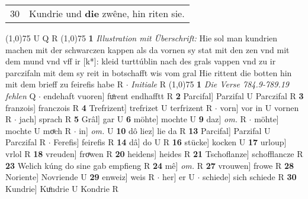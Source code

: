 \documentclass[8pt,a4paper,notitlepage]{article}
\begin{document}
\begin{table}[ht]
\begin{minipage}[t]{0.5\linewidth}
\begin{tabular}{rl}
30 & Kundrie und \textbf{die} zwêne, hin riten sie.\\ 
\end{tabular}
\scriptsize
\line(1,0){75} \newline
U Q R \newline
\line(1,0){75} \newline
\textbf{1} \textit{Illustration mit Überschrift:} Hie sol man kundrien machen mit der schwarczen kappen als da vornen sy stat mit den zen vnd mit dem mund vnd vff ir [k*]: kleid turttúblin nach des grals vappen vnd zu ir parczifaln mit dem sy reit in botschafft wis vom gral Hie rittent die botten hin mit dem brieff zu feirefis habe R   $\cdot$ \textit{Initiale} R  \newline
\line(1,0){75} \newline
\textbf{1} \textit{Die Verse 784.9-789.19 fehlen} Q   $\cdot$ endehaft vuoren] fuͦrent endhafftt R \textbf{2} Parcifal] Parzifal U Parczifal R \textbf{3} franzois] franczois R \textbf{4} Trefrizent] trefrizet U terfrizent R  $\cdot$ vorn] vor in U vornen R  $\cdot$ jach] sprach R \textbf{5} Grâl] gar U \textbf{6} möhte] mochte U \textbf{9} daz] \textit{om.} R  $\cdot$ möhte] mochte U moͯch R  $\cdot$ in] \textit{om.} U \textbf{10} dô liez] lie da R \textbf{13} Parcifal] Parzifal U Parczifal R  $\cdot$ Ferefis] feirefis R \textbf{14} dâ] do U R \textbf{16} stücke] kocken U \textbf{17} urloup] vrlol R \textbf{18} vreuden] froͯwen R \textbf{20} heidens] heides R \textbf{21} Tschoflanze] schofflancze R \textbf{23} Welich kúng do sine gab empfieng R \textbf{24} mê] \textit{om.} R \textbf{27} vrouwen] frowe R \textbf{28} Noriente] Novriende U \textbf{29} enweiz] weis R  $\cdot$ her] er U  $\cdot$ schiede] sich schiede R \textbf{30} Kundrie] Kuͦndrie U Kondrie R \newline
\end{minipage}
\end{table}
\end{document}
